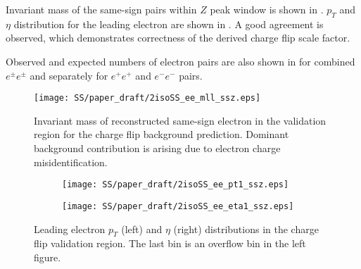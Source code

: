 Invariant mass of the same-sign pairs within $Z$ peak window is shown in . 
$p_T$ and $\eta$ distribution for the leading electron are shown in .
A good agreement is observed, which demonstrates correctness of the derived charge flip scale factor.

Observed and expected numbers of electron pairs are also shown in  for combined $e^{\pm}e^{\pm}$ and separately for $e^{+}e^{+}$ and $e^{-}e^{-}$ pairs.

\begin{figure}[h]
\begin{center}
\texttt{[image: SS/paper\_draft/2isoSS\_ee\_mll\_ssz.eps]}
\caption{Invariant mass of reconstructed same-sign electron in the validation region for the charge flip background prediction.
Dominant background contribution is arising due to electron charge misidentification.
}
\label{fig:charge_flip_CR_inv_mass}
\end{center}
\end{figure} 

\begin{figure}
\begin{subfigure}{.5\textwidth}
  \centering
  \texttt{[image: SS/paper\_draft/2isoSS\_ee\_pt1\_ssz.eps]}
\end{subfigure}%
\begin{subfigure}{.5\textwidth}
  \centering
  \texttt{[image: SS/paper\_draft/2isoSS\_ee\_eta1\_ssz.eps]}
\end{subfigure}
\caption{Leading electron $p_T$ (left) and $\eta$ (right) distributions in the charge flip validation region. The last bin is an overflow bin in the left figure.}
  \label{fig:charge_flip_CR_kinematics}
\end{figure}


